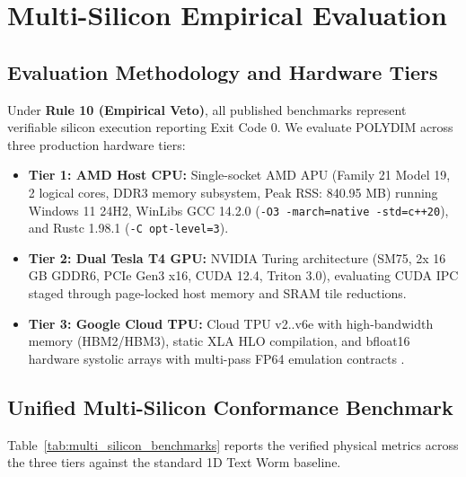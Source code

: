 \documentclass[journal,10pt,compsoc]{IEEEtran}
\theoremstyle{plain}
\theoremstyle{definition}
\begin{document}
\section{Multi-Silicon Empirical Evaluation}
\label{sec:empirical}

\subsection{Evaluation Methodology and Hardware Tiers}
Under \textbf{Rule 10 (Empirical Veto)}, all published benchmarks represent verifiable silicon execution reporting Exit Code 0. We evaluate POLYDIM across three production hardware tiers:
\begin{itemize}
    \item \textbf{Tier 1: AMD Host CPU:} Single-socket AMD APU (Family 21 Model 19, 2 logical cores, DDR3 memory subsystem, Peak RSS: 840.95 MB) running Windows 11 24H2, WinLibs GCC 14.2.0 (\texttt{-O3 -march=native -std=c++20}), and Rustc 1.98.1 (\texttt{-C opt-level=3}).
    \item \textbf{Tier 2: Dual Tesla T4 GPU:} NVIDIA Turing architecture (SM75, 2x 16 GB GDDR6, PCIe Gen3 x16, CUDA 12.4, Triton 3.0), evaluating CUDA IPC staged through page-locked host memory and SRAM tile reductions.
    \item \textbf{Tier 3: Google Cloud TPU:} Cloud TPU v2..v6e with high-bandwidth memory (HBM2/HBM3), static XLA HLO compilation, and bfloat16 hardware systolic arrays with multi-pass FP64 emulation contracts \cite{chen2018tvm}.
\end{itemize}

\subsection{Unified Multi-Silicon Conformance Benchmark}
Table~\ref{tab:multi_silicon_benchmarks} reports the verified physical metrics across the three tiers against the standard 1D Text Worm baseline.
\end{document}
